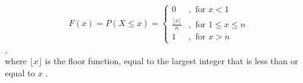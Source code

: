 $$F(x) = P(X \le x) = \begin{cases}  0 &, \text{ for } x < 1\\ \frac{\lfloor x \rfloor}{n} &, \text{ for } 1 \le x \le n\\ 1 &, \text{ for } x > n \end{cases}$$  , \\
where $\lfloor x \rfloor$ is the floor function, equal to the largest integer that is less than or equal to $x$ .